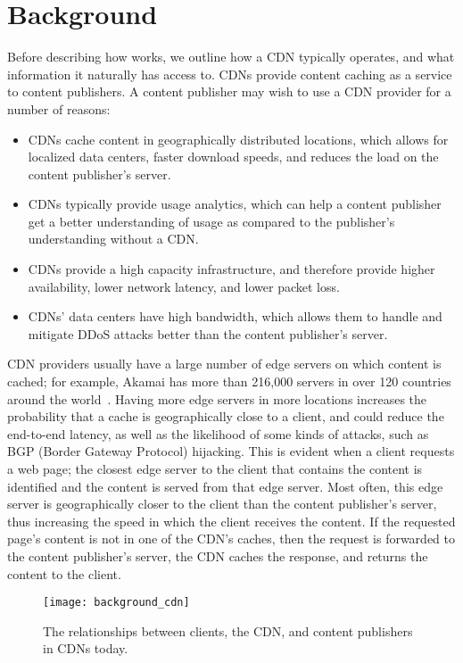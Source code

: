 \section{Background}
\label{sec:background}
Before describing how \system{} works, we outline how a CDN typically operates, and what information 
it naturally has access to.  CDNs provide content caching as a service to content publishers.  A 
content publisher may wish to use a CDN provider for a number of reasons:

\begin{itemize}
\item CDNs cache content in geographically distributed locations, which allows for localized 
data centers, faster download speeds, and reduces the load on the content publisher's server.
\item CDNs typically provide usage analytics, which can help a content publisher get a better 
understanding of usage as compared to the publisher's understanding without a CDN.
\item CDNs provide a high capacity infrastructure, and therefore provide higher availability, 
lower network latency, and lower packet loss.  
\item CDNs' data centers have high bandwidth, which allows them to handle and mitigate DDoS attacks better 
than the content publisher's server.
\end{itemize}

CDN providers usually have a large number of edge servers on which content is cached; for example, 
Akamai has more than 216,000 servers in over 120 countries around the world~\cite{akamai_facts}.  
Having more edge servers in more locations increases the probability that a cache is geographically 
close to a client, and could reduce the end-to-end latency, as well as the likelihood of some kinds of 
attacks, such as BGP (Border Gateway Protocol) hijacking.  This is evident when a client requests a web page; the closest 
edge server to the client that contains the content is identified and the content is served from that 
edge server.  Most often, this edge server is geographically closer to the client than the content publisher's 
server, thus increasing the speed in which the client receives the content. If the requested page's content is 
not in one of the CDN's caches, then the request is forwarded to the content publisher's server, the CDN 
caches the response, and returns the content to the client. 

\begin{figure}[t]
\centering
\texttt{[image: background\_cdn]}
\caption{The relationships between clients, the CDN, and content publishers in 
CDNs today.}
\label{fig:basic_cdn}
\end{figure}

